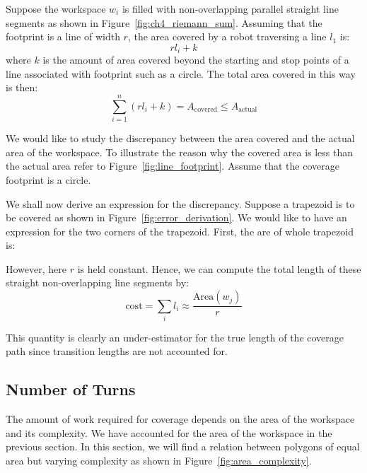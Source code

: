 \documentclass[../main.tex]{subfiles}
\begin{document}

Suppose the workspace $w_i$ is filled with non-overlapping parallel straight line segments as shown in Figure~\ref{fig:ch4_riemann_sum}. Assuming that the footprint is a line of width $r$, the area covered by a robot traversing a line $l_1$ is:
\begin{equation}
	rl_i+k
\end{equation}
where $k$ is the amount of area covered beyond the starting and stop points of a line associated with footprint such as a circle. The total area covered in this way is then:
\begin{equation}
	\sum_{i=1}^n(rl_i+k)=A_{\text{covered}}\leq A_{\text{actual}}
\end{equation}

We would like to study the discrepancy between the area covered and the actual area of the workspace. To illustrate the reason why the covered area is less than the actual area refer to Figure~\ref{fig:line_footprint}. Assume that the coverage footprint is a circle.


We shall now derive an expression for the discrepancy. Suppose a trapezoid is to be covered as shown in Figure~\ref{fig:error_derivation}. We would like to have an expression for the two corners of the trapezoid. First, the are of whole trapezoid is:


%


However, here $r$ is held constant. Hence, we can compute the total length of these straight non-overlapping line segments by:
\begin{equation}
	\text{cost}=\sum_{i}l_i\approx\frac{\text{Area}(w_j)}{r}
\end{equation}

This quantity is clearly an under-estimator for the true length of the coverage path since transition lengths are not accounted for.


\subsection{Number of Turns}

The amount of work required for coverage depends on the area of the workspace and its complexity. We have accounted for the area of the workspace in the previous section. In this section, we will find a relation between polygons of equal area but varying complexity as shown in Figure~\ref{fig:area_complexity}.
\end{document}
